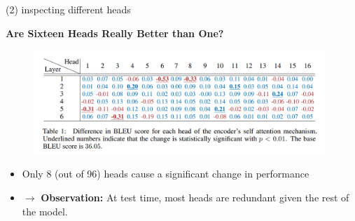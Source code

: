 
\begin{frame}{(2) inspecting different heads}

\vfill

\textbf{Are Sixteen Heads Really Better than One?} 

	\begin{figure}
		\centering
		\includegraphics[width = 11cm]{figure/51-diffbleu.png}
	\end{figure}
		
	\begin{itemize}
		\item Only 8 (out of 96) heads cause a significant change in performance
		\item[] $\to$ \textbf{Observation:} At test time, most heads are redundant given the rest of the model.

	\end{itemize}
	
\vfill

\end{frame}


